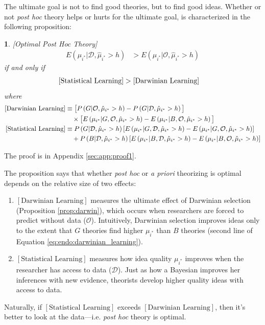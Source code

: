 \documentclass[12pt,english]{article}
\theoremstyle{plain}
\theoremstyle{plain}
\newtheorem{prop}[thm]{\protect\propositionname}
\providecommand{\propositionname}{Proposition}
\providecommand{\propositionname}{Proposition}
\begin{document}
The ultimate goal is not to find good theories, but to find good ideas. Whether or not \emph{post hoc} theory helps or hurts for the ultimate goal, is characterized in the following proposition:
\begin{prop}\label{prop:optimal_post_hoc}
{[}Optimal Post Hoc Theory{]}
\begin{align}
E\left(\mu_{i^{\ast}}|\mathcal{\mathcal{D}},\hat{\mu}_{i^{\ast}}>h\right) & >E\left(\mu_{i^{\ast}}|\mathcal{O},\hat{\mu}_{i^{\ast}}>h\right)
\end{align}
if and only if 
\begin{align}
\text{\ensuremath{\left[\text{Statistical Learning}\right]}} & >\left[\text{Darwinian Learning}\right]
\end{align}
where 
\begin{align}
\left[\text{Darwinian Learning}\right] 
& \equiv
    \big[
        P\left(G|\mathcal{O},\hat{\mu}_{i^{\ast}}>h\right)-
    P\left(G|\mathcal{D},\hat{\mu}_{i^{\ast}}>h\right)
    \big]
    \notag
    \\
& \quad\times
\big[
    E\left(\mu_{i^{\ast}}|G,\mathcal{O},\hat{\mu}_{i^{\ast}}>h\right) - 
    E\left(\mu_{i^{\ast}}|B,\mathcal{O},\hat{\mu}_{i^{\ast}}>h\right)
\big] 
\label{eq:endo:darwinian_learning} \\
\left[\text{Statistical Learning}\right] & 
\equiv 
P\left(G|\mathcal{D}, \hat{\mu}_{i^{\ast}}>h\right)\left[
    E\left(\mu_{i^{\ast}}|G,\mathcal{D}, \hat{\mu}_{i^{\ast}}>h\right) - 
    E\left(\mu_{i^{\ast}}|G,\mathcal{O}, \hat{\mu}_{i^{\ast}}>h\right)
\right] \notag \\ 
& \quad +
P\left(B|\mathcal{D}, \hat{\mu}_{i^{\ast}}>h\right)\left[
    E\left(\mu_{i^{\ast}}|B,\mathcal{D}, \hat{\mu}_{i^{\ast}}>h\right) - 
    E\left(\mu_{i^{\ast}}|B,\mathcal{O}, \hat{\mu}_{i^{\ast}}>h\right)
\right]
\label{eq:endo:statistical_learning}
\end{align}
\end{prop}
The proof is in Appendix \ref{sec:app:proof1}.

The proposition says that whether \emph{post hoc} or \emph{a priori}  theorizing is optimal depends on the relative size of two effects:
\begin{enumerate}
    \item $\left[\text{Darwinian Learning}\right]$ measures the ultimate effect of Darwinian selection (Proposition \ref{prop:darwin}), which occurs when researchers are forced to predict without data ($\mathcal{O}$).  Intuitively, Darwinian selection improves ideas only to the extent that $G$ theories find higher $\mu_{i^\ast}$ than $B$ theories (second line of Equation \eqref{eq:endo:darwinian_learning}). 
    \item $\left[\text{Statistical Learning}\right]$ measures how idea quality $\mu_{i^{\ast}}$ improves when the researcher has access to data ($\mathcal{D}$). Just as how a Bayesian improves her inferences with new evidence, theorists develop higher quality ideas with access to data. 
\end{enumerate}
Naturally, if $\left[\text{Statistical Learning}\right]$ exceeds $\left[\text{Darwinian Learning}\right]$, then it's better to look at the data---i.e. \emph{post hoc} theory is optimal.
\end{document}
